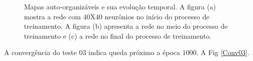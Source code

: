 \begin{figure}[H]
	\centering
	\qquad
	\qquad
	\qquad
	\caption{Mapas auto-organizáveis e sua evolução temporal. A figura (a) mostra a rede com $40$X$40$ neurônios no início do processo de treinamento. A figura (b) apresenta a rede no meio do processo de treinamento e (c) a rede no final do processo de treinamento.}
	\label{SOMt03}
\end{figure}

A convergência do teste $03$ indica queda próximo a época $1000$. A Fig \ref{Conv03}. 


